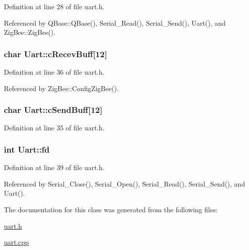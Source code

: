 Definition at line 28 of file uart.\-h.



Referenced by Q\-Base\-::\-Q\-Base(), Serial\-\_\-\-Read(), Serial\-\_\-\-Send(), Uart(), and Zig\-Bee\-::\-Zig\-Bee().

\hypertarget{classUart_afe931bc10d90890bce0d9331edb99598}{
\subsubsection[{c\-Recev\-Buff}]{\setlength{\rightskip}{0pt plus 5cm}char Uart\-::c\-Recev\-Buff\mbox{[}12\mbox{]}\hspace{0.3cm}{\ttfamily [protected]}}}\label{classUart_afe931bc10d90890bce0d9331edb99598}


Definition at line 36 of file uart.\-h.



Referenced by Zig\-Bee\-::\-Config\-Zig\-Bee().

\hypertarget{classUart_a41faef9fcb605cc62769abb551f49b1a}{
\subsubsection[{c\-Send\-Buff}]{\setlength{\rightskip}{0pt plus 5cm}char Uart\-::c\-Send\-Buff\mbox{[}12\mbox{]}\hspace{0.3cm}{\ttfamily [protected]}}}\label{classUart_a41faef9fcb605cc62769abb551f49b1a}


Definition at line 35 of file uart.\-h.

\hypertarget{classUart_a9beb12dfe4b673ede7b05ec04af0dee8}{
\subsubsection[{fd}]{\setlength{\rightskip}{0pt plus 5cm}int Uart\-::fd\hspace{0.3cm}{\ttfamily [private]}}}\label{classUart_a9beb12dfe4b673ede7b05ec04af0dee8}


Definition at line 39 of file uart.\-h.



Referenced by Serial\-\_\-\-Close(), Serial\-\_\-\-Open(), Serial\-\_\-\-Read(), Serial\-\_\-\-Send(), and Uart().



The documentation for this class was generated from the following files\-:\begin{DoxyCompactItemize}
\item 
\hyperlink{uart_8h}{uart.\-h}\item 
\hyperlink{uart_8cpp}{uart.\-cpp}\end{DoxyCompactItemize}
